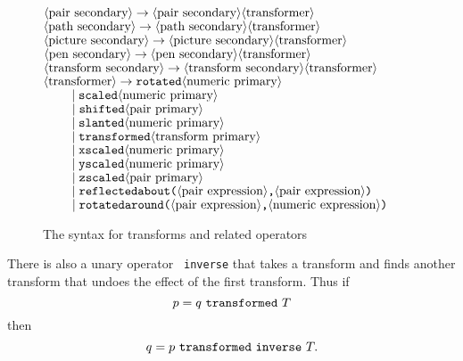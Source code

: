 \documentclass{article} %
\newcommand\descr[1]{{\langle\hbox{#1}\rangle}}
\begin{document}
\begin{figure}[htp]
\begin{ctabbing}
$\tt \descr{pair secondary} \rightarrow
        \descr{pair secondary} \descr{transformer}$\\
$\tt \descr{path secondary} \rightarrow
        \descr{path secondary} \descr{transformer}$\\
$\tt \descr{picture secondary} \rightarrow
        \descr{picture secondary} \descr{transformer}$\\
$\tt \descr{pen secondary} \rightarrow
        \descr{pen secondary} \descr{transformer}$\\
$\tt \descr{transform secondary} \rightarrow
        \descr{transform secondary} \descr{transformer}$\\[6pt]
$\tt \descr{transformer} \rightarrow rotated \descr{numeric primary}$\\
$\tt \qquad \;|\; scaled \descr{numeric primary}$\\
$\tt \qquad \;|\; shifted \descr{pair primary}$\\
$\tt \qquad \;|\; slanted \descr{numeric primary}$\\
$\tt \qquad \;|\; transformed \descr{transform primary}$\\
$\tt \qquad \;|\; xscaled \descr{numeric primary}$\\
$\tt \qquad \;|\; yscaled \descr{numeric primary}$\\
$\tt \qquad \;|\; zscaled \descr{pair primary}$\\
$\tt \qquad \;|\; reflectedabout\hbox{\tt (}\descr{pair expression}
        \hbox{\tt ,}\descr{pair expression}\hbox{\tt )}$\\
$\tt \qquad \;|\; rotatedaround\hbox{\tt (}\descr{pair expression}
        \hbox{\tt ,}\descr{numeric expression}\hbox{\tt )}$
\end{ctabbing}
\caption{The syntax for transforms and related operators}
\label{sytrans}
\end{figure}

There is also a unary operator {\tt
inverse}\label{Dinv} that takes a
transform and finds another transform that undoes the effect of the
first transform.  Thus if
$$ p = q{\tt\ transformed\ }T $$
then
$$ q = p{\tt\ transformed\ inverse\ }T. $$
\end{document}
